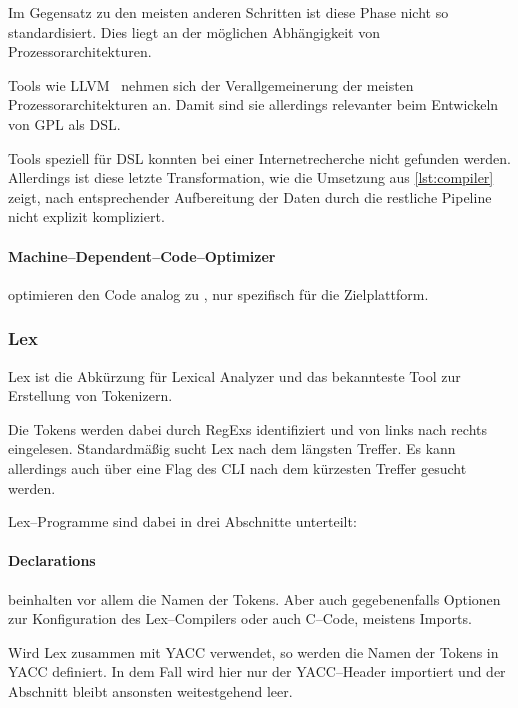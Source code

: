 Im Gegensatz zu den meisten anderen Schritten ist diese Phase nicht so standardisiert.
Dies liegt an der möglichen Abhängigkeit von Prozessorarchitekturen.

Tools wie \ac{LLVM}~\autocite{llvm-project-2024} nehmen sich der Verallgemeinerung der meisten Prozessorarchitekturen an.
Damit sind sie allerdings relevanter beim Entwickeln von \ac{GPL} als \ac{DSL}.

Tools speziell für \ac{DSL} konnten bei einer Internetrecherche nicht gefunden werden.
Allerdings ist diese letzte Transformation, wie die Umsetzung aus \autoref{lst:compiler} zeigt, nach entsprechender Aufbereitung der Daten durch die restliche Pipeline nicht explizit kompliziert.

\paragraph{Machine--Dependent--Code--Optimizer} optimieren den Code analog zu , nur spezifisch für die Zielplattform.

\subsubsection{Lex}\label{subsubsec:lex}
Lex ist die Abkürzung für Lexical Analyzer und das bekannteste Tool zur Erstellung von Tokenizern.

Die Tokens werden dabei durch \acp{RegEx} identifiziert und von links nach rechts eingelesen.
Standardmäßig sucht Lex nach dem längsten Treffer.
Es kann allerdings auch über eine Flag des \ac{CLI} nach dem kürzesten Treffer gesucht werden.

Lex--Programme sind dabei in drei Abschnitte unterteilt:


\paragraph{Declarations} beinhalten vor allem die Namen der Tokens.
Aber auch gegebenenfalls Optionen zur Konfiguration des Lex--Compilers oder auch C--Code, meistens Imports.

Wird Lex zusammen mit \ac{YACC} verwendet, so werden die Namen der Tokens in \ac{YACC} definiert.
In dem Fall wird hier nur der \ac{YACC}--Header importiert und der Abschnitt bleibt ansonsten weitestgehend leer.

